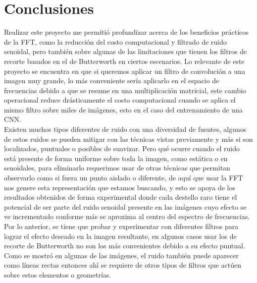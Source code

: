 \section{Conclusiones}
    Realizar este proyecto me permitió profundizar acerca de los beneficios prácticos 
    de la FFT, como la reducción del costo computacional y filtrado de ruido senoidal, 
    pero también sobre algunas de las limitaciones que tienen los filtros de recorte 
    basados en el de Butterworth en ciertos escenarios. Lo relevante de este proyecto 
    se encuentra en que si queremos aplicar un filtro de convolución a una imagen 
    muy grande, lo más conveniente sería aplicarlo en el espacio de frecuencias debido 
    a que se resume en una multiplicación matricial, este cambio operacional reduce 
    drásticamente el costo computacional cuando se aplica el mismo filtro sobre miles 
    de imágenes, esto en el caso del entrenamiento de una CNN.\\

    Existen muchos tipos diferentes de ruido con una diversidad de fuentes, algunos de 
    estos ruidos se pueden mitigar con las técnicas vistas previamente y más si 
    son localizados, puntuales o posibles de suavizar. Pero qué ocurre cuando el ruido 
    está presente de forma uniforme sobre toda la imagen, como estática o en senoidales, 
    para eliminarlo requerimos usar de otras técnicas que permitan observarlo como 
    si fuera un punto aislado o diferente, de aquí que usar la FFT nos genere esta 
    representación que estamos buscando, y esto se apoya de los resultados obtenidos 
    de forma experimental donde cada destello raro tiene el potencial de ser parte 
    del ruido senoidal presente en las imágenes cuyo efecto se ve incrementado conforme 
    más se aproxima al centro del espectro de frecuencias.\\ 

    Por lo anterior, se tiene que probar y experimentar con diferentes filtros para lograr 
    el efecto deseado en la imagen resultante, en algunos casos usar los de recorte 
    de Butterworth no son los más convenientes debido a su efecto puntual. Como se mostró 
    en algunas de las imágenes, el ruido también puede aparecer como líneas rectas entonces 
    ahí se requiere de otros tipos de filtros que actúen sobre estos elementos o geometrías. 